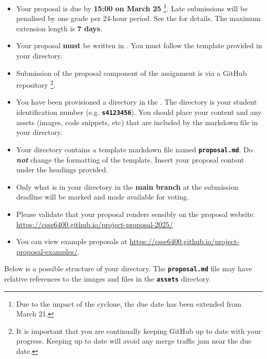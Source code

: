 \documentclass{csse4400}
\begin{document}
\begin{itemize}[topsep=4pt,partopsep=1pt,itemsep=5pt,parsep=2pt]
    \item Your proposal is due by \textbf{15:00 on March 25}%
          \footnote{Due to the impact of the cyclone, the due date has been extended from March 21.}.
          Late submissions will be penalised by one grade per 24-hour period.
          See the 
          for details.
          The maximum extension length is \textbf{7 days}.
    \item Your proposal \textbf{must} be written in .
          You must follow the template provided in your directory.
    \item Submission of the proposal component of the assignment is via a GitHub repository%
          \footnote{It is important that you are continually keeping GitHub up to date with your progress.
                    Keeping up to date will avoid any merge traffic jam near the due date.}.
    \item You have been provisioned a directory in the
          .
          The directory is your student identification number (e.g. \textbf{\texttt{s4123456}}).
          You should place your content and any assets (images, code snippets, etc)
          that are included by the markdown file in your directory.
    \item Your directory contains a template markdown file named \textbf{\texttt{proposal.md}}.
          Do \textbf{\textit{not}} change the formatting of the template.
          Insert your proposal content under the headings provided.
    \item Only what is in your directory in the \textbf{main branch} at the submission deadline
          will be marked and made available for voting.
    \item Please validate that your proposal renders sensibly on the proposal website:\\
          \url{https://csse6400.github.io/project-proposal-2025/}
    \item You can view example proposals at \url{https://csse6400.github.io/project-proposal-examples/}.
\end{itemize}

\begin{samepage}
\noindent
Below is a possible structure of your directory.
The \textbf{\texttt{proposal.md}} file may have relative references to the images and files in the \textbf{\texttt{assets}} directory.
\end{samepage}
\end{document}
